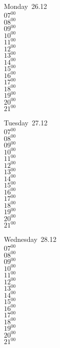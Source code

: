 \documentclass[11pt,a4paper]{book}\usepackage[]{graphicx}\usepackage[]{color}
\begin{document}
\begin{headerbox}
\end{headerbox}
\begin{weekdaybox}
  Monday~26.12\\
  { 
  \vfill
  $07^{00}$\\
$08^{00}$\\
$09^{00}$\\
$10^{00}$\\
$11^{00}$\\
$12^{00}$\\
$13^{00}$\\
$14^{00}$\\
$15^{00}$\\
$16^{00}$\\
$17^{00}$\\
$18^{00}$\\
$19^{00}$\\
$20^{00}$\\
$21^{00}$\\
  }
\end{weekdaybox}
\begin{weekdaybox}
  Tuesday~27.12\\
  { 
  \vfill
  $07^{00}$\\
$08^{00}$\\
$09^{00}$\\
$10^{00}$\\
$11^{00}$\\
$12^{00}$\\
$13^{00}$\\
$14^{00}$\\
$15^{00}$\\
$16^{00}$\\
$17^{00}$\\
$18^{00}$\\
$19^{00}$\\
$20^{00}$\\
$21^{00}$\\
  }
\end{weekdaybox}
\begin{weekdaybox}
  Wednesday~28.12\\
  { 
  \vfill
  $07^{00}$\\
$08^{00}$\\
$09^{00}$\\
$10^{00}$\\
$11^{00}$\\
$12^{00}$\\
$13^{00}$\\
$14^{00}$\\
$15^{00}$\\
$16^{00}$\\
$17^{00}$\\
$18^{00}$\\
$19^{00}$\\
$20^{00}$\\
$21^{00}$\\
  }
\end{weekdaybox}
\end{document}
